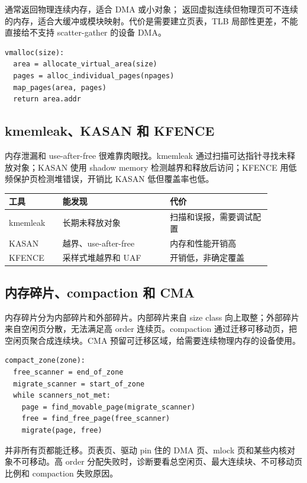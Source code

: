  通常返回物理连续内存，适合 DMA 或小对象； 返回虚拟连续但物理页可不连续的内存，适合大缓冲或模块映射。代价是需要建立页表，TLB 局部性更差，不能直接给不支持 scatter-gather 的设备 DMA。

\begin{lstlisting}
vmalloc(size):
  area = allocate_virtual_area(size)
  pages = alloc_individual_pages(npages)
  map_pages(area, pages)
  return area.addr
\end{lstlisting}

\subsection{kmemleak、KASAN 和 KFENCE}

内存泄漏和 use-after-free 很难靠肉眼找。kmemleak 通过扫描可达指针寻找未释放对象；KASAN 使用 shadow memory 检测越界和释放后访问；KFENCE 用低频保护页检测堆错误，开销比 KASAN 低但覆盖率也低。

\begin{longtable}{|p{0.18\linewidth}|p{0.36\linewidth}|p{0.34\linewidth}|}
\toprule
工具 & 能发现 & 代价 \\
\midrule
kmemleak & 长期未释放对象 & 扫描和误报，需要调试配置 \\\tablerowrule
KASAN & 越界、use-after-free & 内存和性能开销高 \\\tablerowrule
KFENCE & 采样式堆越界和 UAF & 开销低，非确定覆盖 \\
\bottomrule
\end{longtable}

\subsection{内存碎片、compaction 和 CMA}

内存碎片分为内部碎片和外部碎片。内部碎片来自 size class 向上取整；外部碎片来自空闲页分散，无法满足高 order 连续页。compaction 通过迁移可移动页，把空闲页聚合成连续块。CMA 预留可迁移区域，给需要连续物理内存的设备使用。

\begin{lstlisting}
compact_zone(zone):
  free_scanner = end_of_zone
  migrate_scanner = start_of_zone
  while scanners_not_met:
    page = find_movable_page(migrate_scanner)
    free = find_free_page(free_scanner)
    migrate(page, free)
\end{lstlisting}

并非所有页都能迁移。页表页、驱动 pin 住的 DMA 页、mlock 页和某些内核对象不可移动。高 order 分配失败时，诊断要看总空闲页、最大连续块、不可移动页比例和 compaction 失败原因。

